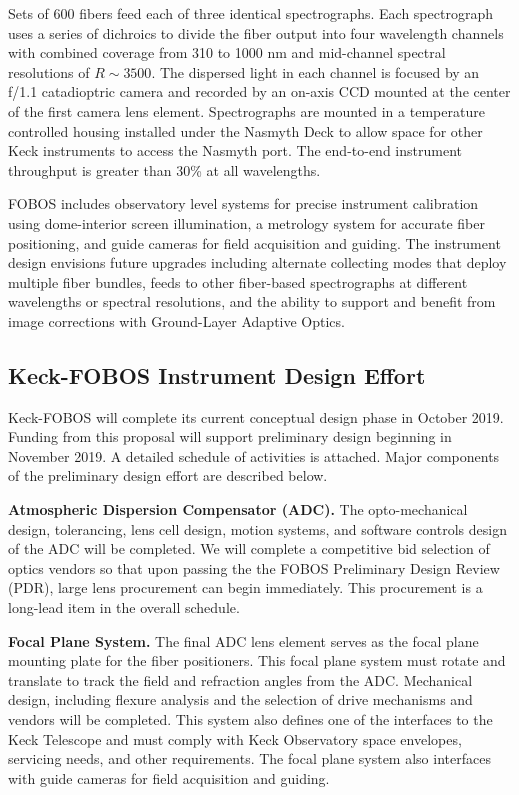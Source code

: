 \documentclass[oneside,11pt]{amsart}
\newcommand{\comment}[2][todo]{{\color{#1}[[{\bf #2}]]}}
\begin{document}
Sets of 600 fibers feed each of three identical spectrographs.  Each spectrograph uses a series of dichroics to divide
the fiber output into four wavelength channels with combined coverage from 310 to 1000 nm and mid-channel spectral
resolutions of $R \sim 3500$.  The dispersed light in each channel is focused by an f/1.1 catadioptric camera and
recorded by an on-axis CCD mounted at the center of the first camera lens element.  Spectrographs are mounted in a
temperature controlled housing installed under the Nasmyth Deck to allow space for other Keck instruments to access the
Nasmyth port.  The end-to-end instrument throughput is greater than 30\% at all wavelengths.

FOBOS includes observatory level systems for precise instrument calibration using dome-interior screen illumination, a
metrology system for accurate fiber positioning, and guide cameras for field acquisition and guiding.  The instrument
design envisions future upgrades including alternate collecting modes that deploy multiple fiber bundles, feeds to
other fiber-based spectrographs at different wavelengths or spectral resolutions, and the ability to support and
benefit from image corrections with Ground-Layer Adaptive Optics.



\subsection{Keck-FOBOS Instrument Design Effort}
\label{sec:design}
\noindent \comment{1 page}

Keck-FOBOS will complete its current conceptual design phase in October 2019.  Funding from this proposal will support preliminary design beginning in November 2019.  A detailed schedule of activities is attached.  Major components of the preliminary design effort are described below.

\noindent \textbf{Atmospheric Dispersion Compensator (ADC).} The opto-mechanical design, tolerancing, lens cell design, motion systems, and software controls design of the ADC will be completed.  We will complete a competitive bid selection of optics vendors so that upon passing the the FOBOS Preliminary Design Review (PDR), large lens procurement can begin immediately.  This procurement is a long-lead item in the overall schedule.

\noindent \textbf{Focal Plane System.} The final ADC lens element serves as the focal plane mounting plate for the fiber positioners.  This focal plane system must rotate and translate to track the field and refraction angles from the ADC.  Mechanical design, including flexure analysis and the selection of drive mechanisms and vendors will be completed.  This system also defines one of the interfaces to the Keck Telescope and must comply with Keck Observatory space envelopes, servicing needs, and other requirements.  The focal plane system also interfaces with guide cameras for field acquisition and guiding.
\end{document}
